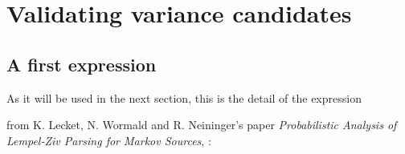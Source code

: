 	
	
	
	
	
	\section{Validating variance candidates}
	\subsection{A first expression}
	As it will be used in the next section, this is the detail of the expression

		
	from K. Lecket, N. Wormald and R. Neininger's paper 
	\textit{Probabilistic Analysis of Lempel-Ziv Parsing for Markov Sources},  :
		
	
	
	
